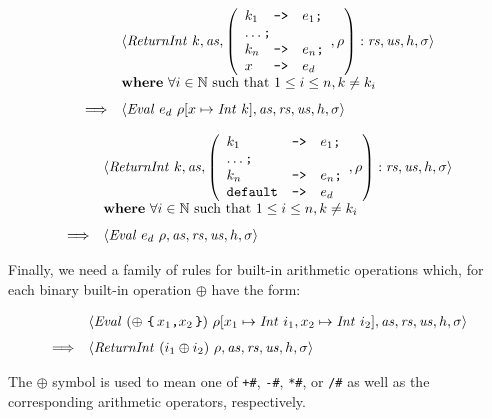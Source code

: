 \begin{mdframed}
\begin{equation}
\begin{array}{cl}
 & \langle \mathit{ReturnInt}~k, \mathit{as}, \left(\begin{array}{lcl}
 k_1 & \texttt{->} & e_1 \texttt{;} \\
 \multicolumn{3}{l}{\ldots \texttt{;}} \\
 k_n & \texttt{->} & e_n \texttt{;} \\
 x & \texttt{->} & e_d
 \end{array}, \rho\right) : \mathit{rs}, \mathit{us}, h, \sigma \rangle \\
 & \mathbf{where}~\forall i \in \mathbb{N}~\text{such that}~1 \leq i \leq n, k \neq k_i \\[0.25cm]
\Longrightarrow & \langle \mathit{Eval}~e_d~\rho[x \mapsto \mathit{Int}~k], \mathit{as}, \mathit{rs}, \mathit{us}, h, \sigma \rangle
\end{array}
\end{equation}
\end{mdframed}
\begin{mdframed}
\begin{equation}
\begin{array}{cl}
 & \langle \mathit{ReturnInt}~k, \mathit{as}, \left(\begin{array}{lcl}
 k_1 & \texttt{->} & e_1 \texttt{;} \\
 \multicolumn{3}{l}{\ldots \texttt{;}} \\
 k_n & \texttt{->} & e_n \texttt{;} \\
 \texttt{default} & \texttt{->} & e_d
 \end{array}, \rho\right) : \mathit{rs}, \mathit{us}, h, \sigma \rangle \\
 & \mathbf{where}~\forall i \in \mathbb{N}~\text{such that}~1 \leq i \leq n, k \neq k_i \\[0.25cm]
\Longrightarrow & \langle \mathit{Eval}~e_d~\rho, \mathit{as}, \mathit{rs}, \mathit{us}, h, \sigma \rangle
\end{array}
\end{equation}
\end{mdframed}
Finally, we need a family of rules for built-in arithmetic operations which, for each binary built-in operation $\oplus$ have the form:
\begin{mdframed}
\begin{equation}
\begin{array}{cl}
 & \langle \mathit{Eval}~(\oplus~\texttt{\{\,$x_1\texttt{,} x_2$\,\}})~\rho[x_1 \mapsto \mathit{Int}~i_1, x_2 \mapsto \mathit{Int}~i_2], \mathit{as}, \mathit{rs}, \mathit{us}, h, \sigma \rangle \\[0.25cm]
\Longrightarrow & \langle \mathit{ReturnInt}~(i_1 \oplus i_2)~\rho, \mathit{as}, \mathit{rs}, \mathit{us}, h, \sigma \rangle 
\end{array}
\end{equation}
\end{mdframed}
The $\oplus$ symbol is used to mean one of \texttt{+\#}, \texttt{-\#}, \texttt{*\#}, or \texttt{/\#} as well as the corresponding arithmetic operators, respectively.

